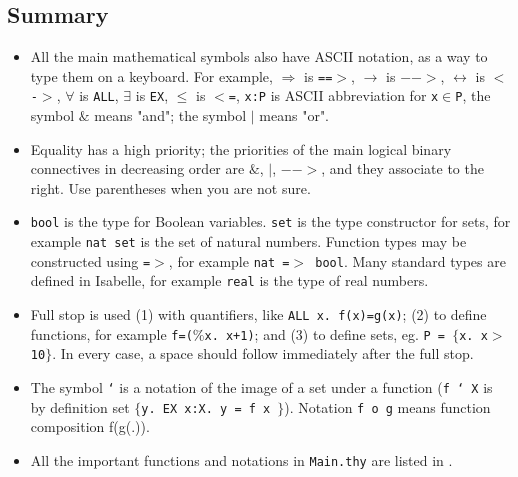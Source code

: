 \documentclass[11pt]{article}
\begin{document}
\subsection{Summary}

\begin{itemize}

    \item All the main mathematical symbols also have ASCII notation, as a way to type them on a keyboard. For example, {\tt $\Longrightarrow$} is {\tt ==$>$}, {\tt $\longrightarrow$} is {\tt $-->$}, {\tt $\leftrightarrow$} is {\tt $<$-$>$}, {\tt $\forall$} is {\tt ALL},  $\exists$ is {\tt EX}, {\tt $\leq$} is {\tt $<$=},
          {\tt x:P} is ASCII abbreviation for {\tt x$\in$P}, the symbol {\tt $\&$} means "and"; the symbol {\tt $|$} means "or".

    \item Equality has a high priority; the priorities of the main logical binary connectives in decreasing order are {\tt $\&$}, {\tt $|$}, {\tt $-->$}, and they associate to the right. Use parentheses when you are not sure.


    \item {\tt bool} is the type for Boolean variables. {\tt set} is the type constructor for sets, for example {\tt nat set} is the set of natural numbers. Function types may be constructed using {\tt =$>$}, for example {\tt nat =$>$ bool}. Many standard types are defined in Isabelle, for example {\tt real} is the type of real numbers.

    \item Full stop is used (1) with quantifiers, like {\tt ALL x.~f(x)=g(x)}; (2) to define functions, for example  {\tt f=($\%$x.~x+1)}; and (3) to define sets, eg. {\tt P = $\{$x.~x$>$10$\}$}. In every case, a space should follow immediately after the full stop.

    \item The symbol {\tt `} is a notation of the image of a set under a function ({\tt f ` X} is by definition set {\tt $\{$y.~EX~x:X. y = f x $\}$}). Notation {\tt f~o~g} means function composition f(g(.)).

    \item All the important functions and notations in {\tt Main.thy} are listed in \cite{main}.

\end{itemize}
\end{document}

